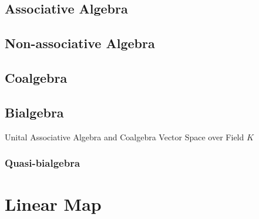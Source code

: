 \subsection{Associative Algebra}\label{sec:associative_algebra}

\subsection{Non-associative Algebra}
\label{sec:nonassociative_algebra}

\subsection{Coalgebra}\label{sec:coalgebra}

\subsection{Bialgebra}\label{sec:bialgebra}

Unital Associative Algebra and Coalgebra Vector Space over Field $K$



\subsubsection{Quasi-bialgebra}\label{sec:quasi_bialgebra}



\section{Linear Map}\label{sec:linear_map}
